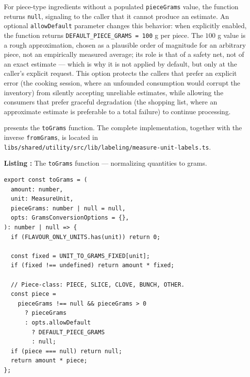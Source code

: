 For piece-type ingredients without a populated \texttt{pieceGrams} value, the function returns \texttt{null}, signaling to the caller that it cannot produce an estimate. An optional \texttt{allowDefault} parameter changes this behavior: when explicitly enabled, the function returns \texttt{DEFAULT\_PIECE\_GRAMS = 100} g per piece. The \(100\) g value is a rough approximation, chosen as a plausible order of magnitude for an arbitrary piece, not an empirically measured average; its role is that of a safety net, not of an exact estimate --- which is why it is not applied by default, but only at the caller's explicit request. This option protects the callers that prefer an explicit error (the cooking session, where an unfounded consumption would corrupt the inventory) from silently accepting unreliable estimates, while allowing the consumers that prefer graceful degradation (the shopping list, where an approximate estimate is preferable to a total failure) to continue processing.

 presents the \texttt{toGrams} function. The complete implementation, together with the inverse \texttt{fromGrams}, is located in \texttt{libs/\allowbreak shared/\allowbreak utility/\allowbreak src/\allowbreak lib/\allowbreak labeling/\allowbreak measure-unit-labels.ts}.

\label{lst:to-grams}
\par\medskip
\noindent\begin{minipage}{\linewidth}
\textbf{Listing \thecodlista:} The \texttt{toGrams} function --- normalizing quantities to grams.
\begin{Verbatim}[fontsize=\small]
export const toGrams = (
  amount: number,
  unit: MeasureUnit,
  pieceGrams: number | null = null,
  opts: GramsConversionOptions = {},
): number | null => {
  if (FLAVOUR_ONLY_UNITS.has(unit)) return 0;

  const fixed = UNIT_TO_GRAMS_FIXED[unit];
  if (fixed !== undefined) return amount * fixed;

  // Piece-class: PIECE, SLICE, CLOVE, BUNCH, OTHER.
  const piece =
    pieceGrams !== null && pieceGrams > 0
      ? pieceGrams
      : opts.allowDefault
        ? DEFAULT_PIECE_GRAMS
        : null;
  if (piece === null) return null;
  return amount * piece;
};
\end{Verbatim}
\end{minipage}
\par\medskip
